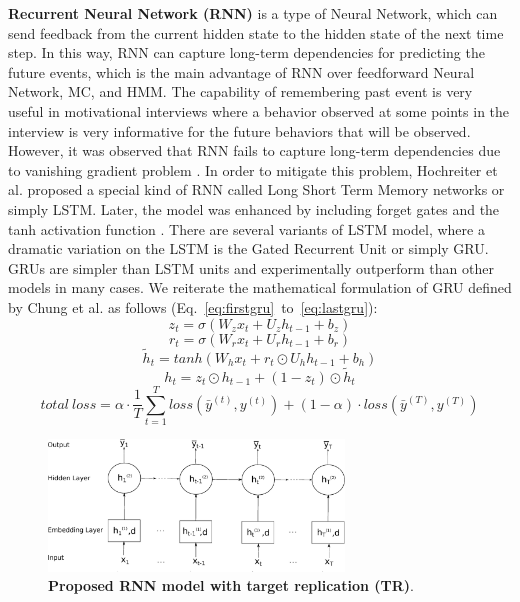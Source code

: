 \documentclass{amia_summit_2018}
\begin{document}
\textbf {Recurrent Neural Network (RNN)} is a type of Neural Network, which can send feedback from the current hidden state to the hidden state of the next time step. In this way, RNN can capture long-term dependencies for predicting the future events, which is the main advantage of RNN over feedforward Neural Network, MC, and HMM. The capability of remembering past event is very useful in motivational interviews where a behavior observed at some points in the interview is very informative for the future behaviors that will be observed. However, it was observed that RNN fails to capture long-term dependencies due to vanishing gradient problem \cite{bengio1993problem}. In order to mitigate this problem, Hochreiter et al.\cite{hochreiter1997long} proposed a special kind of RNN called Long Short Term Memory networks or simply LSTM. Later, the model was enhanced by including forget gates and the tanh activation function \cite{graves2013speech}. There are several variants of LSTM model, where a dramatic variation on the LSTM is the Gated Recurrent Unit\cite{cho2014properties} or simply GRU. GRUs are simpler than LSTM units and experimentally outperform than other models in many cases. We reiterate the mathematical formulation of GRU defined by Chung et al.\cite{chung2014empirical} as follows (Eq.~\ref{eq:firstgru}~to~\ref{eq:lastgru}):
\begin{equation}
z_t = \sigma(W_zx_t + U_zh_{t-1} + b_z)
\label{eq:firstgru}
\end{equation}
\begin{equation}
r_t = \sigma(W_rx_t + U_rh_{t-1} + b_r)
\end{equation}
\begin{equation}
\tilde h_t = tanh(W_hx_t + r_t \odot U_hh_{t-1} + b_h) 
\end{equation}
\begin{equation}
h_t = z_t \odot h_{t-1} + (1-z_t) \odot \tilde h_t
\label{eq:lastgru}
\end{equation}  
\begin{equation}
total\ loss = \alpha \cdot \frac{1}{T}\sum_{t=1}^T loss(\bar y^{(t)},y^{(t)}) + (1 - \alpha) \cdot loss(\bar y^{(T)},y^{(T)})
\label{eq:loss}
\end{equation}  
\begin{figure}[!htb]
    \centering
    \includegraphics[width=0.70\textwidth]{figures/rnn.eps}
    \caption{\textbf{Proposed RNN model with target replication (TR)}.}
    \label{fig:rnn-model}
\end{figure}
\end{document}
